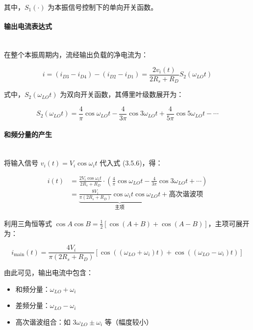 \documentclass[12pt]{article}
\begin{document}
其中，$S_1(\cdot)$ 为本振信号控制下的单向开关函数。

\paragraph{输出电流表达式}~\\

在整个本振周期内，流经输出负载的净电流为：

\begin{equation}
i = (i_{D3} - i_{D4}) - (i_{D2} - i_{D1}) = \frac{2v_i(t)}{2R_s + R_D} S_2(\omega_{LO} t)
\tag{3.5.6}
\end{equation}

式中，$S_2(\omega_{LO} t)$ 为双向开关函数，其傅里叶级数展开为：

\begin{equation}
S_2(\omega_{LO} t) = \frac{4}{\pi} \cos \omega_{LO} t - \frac{4}{3\pi} \cos 3\omega_{LO} t + \frac{4}{5\pi} \cos 5\omega_{LO} t - \cdots
\end{equation}

\paragraph{和频分量的产生}~\\

将输入信号 $v_i(t) = V_i \cos \omega_i t$ 代入式 (3.5.6)，得：

\begin{align}
i(t) &= \frac{2V_i \cos \omega_i t}{2R_s + R_D} \cdot \left( \frac{4}{\pi} \cos \omega_{LO} t - \frac{4}{3\pi} \cos 3\omega_{LO} t + \cdots \right) \\
&= \underbrace{\frac{8V_i}{\pi(2R_s + R_D)} \cos \omega_i t \cos \omega_{LO} t}_{\text{主项}} + \text{高次谐波项}
\end{align}

利用三角恒等式 $\cos A \cos B = \frac{1}{2} [\cos(A+B) + \cos(A-B)]$，主项可展开为：

\begin{equation}
i_{\text{main}}(t) = \frac{4V_i}{\pi(2R_s + R_D)} \left[ \cos((\omega_{LO} + \omega_i)t) + \cos((\omega_{LO} - \omega_i)t) \right]
\end{equation}

由此可见，输出电流中包含：
\begin{itemize}
    \item 和频分量：$\omega_{LO} + \omega_i$
    \item 差频分量：$\omega_{LO} - \omega_i$
    \item 高次谐波组合：如 $3\omega_{LO} \pm \omega_i$ 等（幅度较小）
\end{itemize}
\end{document}
